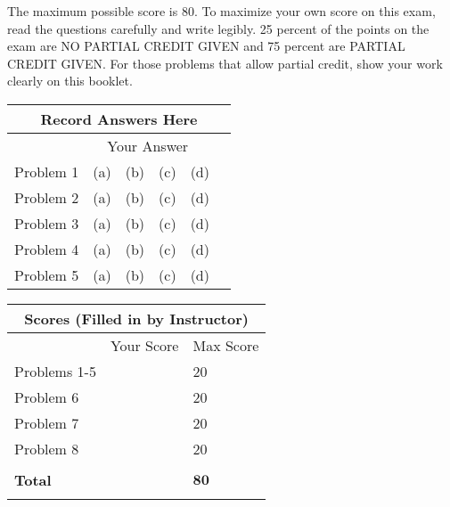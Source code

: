 \documentclass[letterpaper]{article}
\begin{document}
\noindent The maximum possible score is 80. To maximize your own score on this exam, read the questions carefully and write legibly. 25 percent of the points on the exam are NO
PARTIAL CREDIT GIVEN and 75 percent are PARTIAL CREDIT GIVEN. For those problems that allow partial credit, show your work clearly on this booklet.

\newpage

\vspace*{1in}

\begin{center}
\Large
\begin{tabular}{|p{1.2in}|p{1.5in}|}
\hline
\multicolumn{2}{|c|}{\textbf{Record Answers Here}}\\
\hline
 & ~~Your Answer\\
\hline
Problem 1 &   (a)~~(b)~~(c)~~(d)~~\\
\hline
Problem 2 &   (a)~~(b)~~(c)~~(d)~~\\
\hline
Problem 3 &   (a)~~(b)~~(c)~~(d)~~\\
\hline
Problem 4 &   (a)~~(b)~~(c)~~(d)~~\\
\hline
Problem 5 &   (a)~~(b)~~(c)~~(d)~~\\
\hline
\end{tabular}
\end{center}

\vspace*{1in}

\begin{center}
\begin{tabular}{|p{2in}|p{1in}|p{1in}|}
\hline
\multicolumn{3}{|c|}{\textbf{Scores (Filled in by Instructor)}}\\
\hline
 & Your Score& Max Score \\
\hline
Problems 1-5 &  &   20\\
\hline
Problem 6 &  &   20\\
\hline
Problem 7 &  &   20\\
\hline
Problem 8 &  &   20\\
\hline
& & \\
\hline
\textbf{Total} &  &   $\mathbf{80}$\\
\hline
& & \\
\hline
%
\end{tabular}
\end{center}

\newpage
\end{document}
